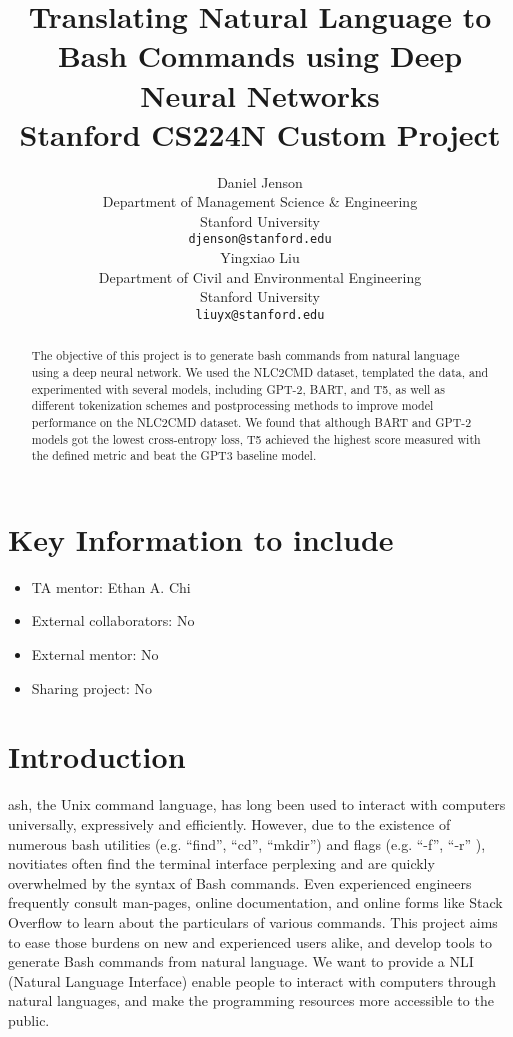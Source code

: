 \documentclass{article}
\title{
  Translating Natural Language to Bash Commands using Deep Neural Networks \\
  \vspace{1em}
  \small{\normalfont Stanford CS224N Custom Project}
}
\author{
 Daniel Jenson \\
  Department of Management Science \& Engineering \\
  Stanford University \\
  \texttt{djenson@stanford.edu} \\
  \And
  Yingxiao Liu \\
  Department of Civil and Environmental Engineering \\
  Stanford University \\
  \texttt{liuyx@stanford.edu} \\
}
\begin{document}
\maketitle

\begin{abstract}
	The objective of this project is to generate bash commands from natural
	language using a deep neural network. We used the NLC2CMD dataset, templated
	the data, and experimented with several models, including GPT-2, BART, and T5,
	as well as different tokenization schemes and postprocessing methods to improve
	model performance on the NLC2CMD dataset. We found that although BART and GPT-2
	models got the lowest cross-entropy loss, T5 achieved the highest score
	measured with the defined metric and beat the GPT3 baseline model.
\end{abstract}


\section{Key Information to include}
\begin{itemize}
	\item TA mentor: Ethan A. Chi
	\item External collaborators: No
	\item External mentor: No
	\item Sharing project: No
\end{itemize}


\section{Introduction}
ash, the Unix command language, has long been used to interact with computers
universally, expressively and efficiently.  However, due to the existence of
numerous bash utilities (e.g. ``find'', ``cd'', ``mkdir'') and flags (e.g.
``-f'', ``-r'' ), novitiates often find the terminal interface perplexing and
are quickly overwhelmed by the syntax of Bash commands. Even experienced
engineers frequently consult man-pages, online documentation, and online forms
like Stack Overflow to learn about the particulars of various commands. This
project aims to ease those burdens on new and experienced users alike, and
develop tools to generate Bash commands from natural language. We want to
provide a NLI (Natural Language Interface) enable people to interact with
computers through natural languages, and make the programming resources more
accessible to the public.
\end{document}
